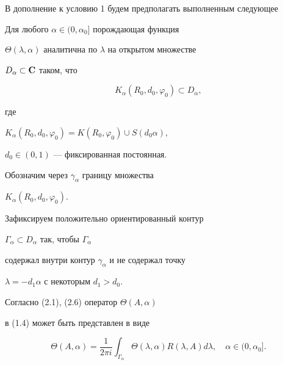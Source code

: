 В дополнение к условию 1 будем предполагать выполненным следующее





\begin{cond}


Для любого $\alpha \in (0,\alpha_0]$ порождающая функция


$\Theta(\lambda, \alpha)$ аналитична по $\lambda$ на открытом множестве


$D_{\alpha} \subset {\bold C}$ таком, что


\begin{equation}


K_{\alpha}(R_0,d_0,\varphi_0) \subset D_{\alpha},


\tag{2.6}


\end{equation}


где


$K_{\alpha}(R_0,d_0,\varphi_0)=K(R_0,\varphi_0) \cup S(d_0 \alpha),$


$d_0 \in (0,1)$ --- фиксированная постоянная.


\end{cond}





Обозначим через $\gamma_{\alpha}$ границу множества


$K_{\alpha}(R_0,d_0,\varphi_0)$.


Зафиксируем положительно ориентированный контур


$\Gamma_{\alpha} \subset D_{\alpha}$ так, чтобы $\Gamma_{\alpha}$


содержал внутри контур $\gamma_{\alpha}$ и не содержал точку


$\lambda=-d_1 \alpha$ с некоторым $d_1>d_0$.


Согласно (2.1), (2.6) оператор $\Theta(A, \alpha)$


в (1.4) может быть представлен в виде


\begin{equation}


\Theta(A, \alpha)=\frac{1}{2 \pi i} \int_{\Gamma_{\alpha}}


\Theta(\lambda, \alpha) R(\lambda,A)d \lambda,


\quad \alpha \in (0,\alpha_0].


\tag{2.7}


\end{equation}





